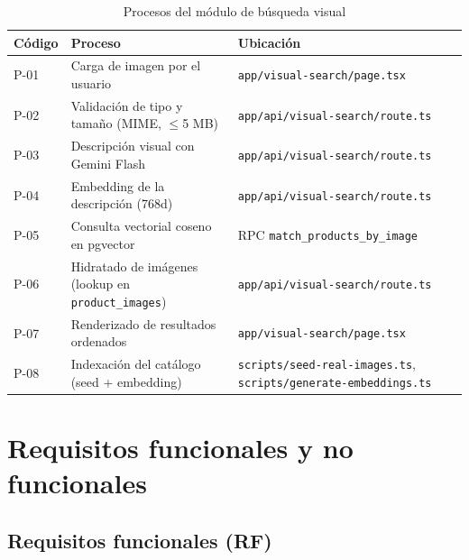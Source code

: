 \documentclass[11pt,letterpaper]{article}
\begin{document}
\begin{table}[H]
\centering
\caption{Procesos del módulo de búsqueda visual}
\label{tab:procesos}
\begin{tabularx}{\linewidth}{l X l}
\toprule
\textbf{Código} & \textbf{Proceso} & \textbf{Ubicación} \\
\midrule
P-01 & Carga de imagen por el usuario & \texttt{app/visual-search/page.tsx} \\
P-02 & Validación de tipo y tamaño (MIME, $\leq$5 MB) & \texttt{app/api/visual-search/route.ts} \\
P-03 & Descripción visual con Gemini Flash & \texttt{app/api/visual-search/route.ts} \\
P-04 & Embedding de la descripción (768d) & \texttt{app/api/visual-search/route.ts} \\
P-05 & Consulta vectorial coseno en pgvector & RPC \texttt{match\_products\_by\_image} \\
P-06 & Hidratado de imágenes (lookup en \texttt{product\_images}) & \texttt{app/api/visual-search/route.ts} \\
P-07 & Renderizado de resultados ordenados & \texttt{app/visual-search/page.tsx} \\
P-08 & Indexación del catálogo (seed + embedding) & \texttt{scripts/seed-real-images.ts}, \texttt{scripts/generate-embeddings.ts} \\
\bottomrule
\end{tabularx}
\end{table}

\section{Requisitos funcionales y no funcionales}

\subsection{Requisitos funcionales (RF)}
\end{document}
